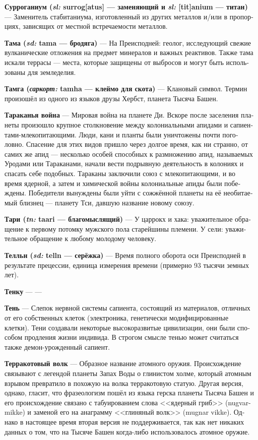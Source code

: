 \documentclass[a4paper,12pt,fleqn]{book}\usepackage{cooltooltips}\usepackage{polyglossia}\setdefaultlanguage[babelshorthands=true]{russian}\setotherlanguage{english}\defaultfontfeatures{Ligatures=TeX,Mapping=tex-text} \usepackage{xcolor}\definecolor{lightgray}{HTML}{bbbbbb}\color{lightgray}\newcommand{\ml}[3]{\textenglish{\textcolor{black}{#3}}}
\newcommand{\theterm}[3]{\textbf{\hypertarget{#1}{#2}} --- #3}
\newcommand{\theorigin}[3]{\textit{#1:} #2 --- #3}
\begin{document}
{\theterm{surroganium}
{Сурроганиум (\theorigin{sl}{surrog[atus]}{заменяющий} и \theorigin{sl}{[tit]anium}{титан})}
{Заменитель стабитаниума, изготовленный из других металлов и/или в пропорциях, зависящих от местной встречаемости металлов.}

\theterm{tama}
{Тама (\theorigin{sd}{tama}{бродяга})}
{На Преисподней: геолог, исследующий свежие вулканические отложения на предмет минералов и важных реактивов.
Также тама искали террасы --- места, которые защищены от выбросов и могут быть использованы для земледелия.}

\theterm{tamja}
{Тамга (\theorigin{саркорт}{tamha}{клеймо для скота})}
{Клановый символ.
Термин произошёл из одного из языков друзы Хербст, планета Тысяча Башен.}

\theterm{cockroach-war}
{Тараканья война}
{Мировая война на планете Ди.
Вскоре после заселения планеты произошло крупное столкновение между колониальными апидами и сапиентами-млекопитающими.
Люди, кани и планты были уничтожены почти поголовно.
Спасение для этих видов пришло через долгое время, как ни странно, от самих же апид --- несколько особей способных к размножению апид, называемых Уродами или Тараканами, начали вести подрывную деятельность в колониях и спасать себе подобных.
Тараканы заключили союз с млекопитающими, и во время ядерной, а затем и химической войны колониальные апиды были побеждены.
Победители вынуждены были уйти с сожжённой планеты на её необитаемый близнец --- планету Тси, давшую название новому союзу.}

\theterm{taari}
{Тари (\theorigin{tn}{taari}{благомыслящий})}
{У царрокх и хака: уважительное обращение к первому потомку мужского пола старейшины племени.
У сели: уважительное обращение к любому молодому человеку.}

\theterm{telln}
{Телльн (\theorigin{sd}{telln}{серёжка})}
{Время полного оборота оси Преисподней в результате прецессии, единица измерения времени (примерно 93 тысячи земных лет).}

\theterm{technku} %
{Тенку}
{---}

\theterm{shadow}
{Тень}
{Слепок нервной системы сапиента, состоящий из материалов, отличных от его собственных клеток (электроника, генетически модифицированные клетки).
Тени создавали некоторые высокоразвитые цивилизации, они были способом продления жизни индивида.
В строгом смысле тенью может считаться также демон-урожденный сапиент.}

\theterm{terracota-wolf}
{Терракотовый волк}
{Образное название атомного оружия.
Происхождение связывают с легендой планеты Запах Воды о глинистом холме, который атомным взрывом превратило в похожую на волка терракотовую статую.
Другая версия, однако, гласит, что фразеологизм пошёл из языка герска планеты Тысяча Башен и его происхождение связано с табуированием слова <<ядерный гриб>> (nugvar-mikke) и заменой его на анаграмму <<глиняный волк>> (mugnar vikke).
Однако в настоящее время вторая версия не поддерживается, так как нет никаких данных о том, что на Тысяче Башен когда-либо использовалось атомное оружие.}

}
\end{document}
